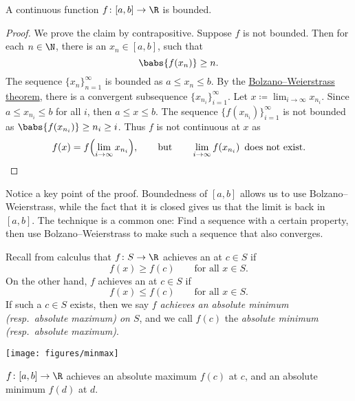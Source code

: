 \begin{lemma}
A continuous function $f \colon [a,b] \to \R$ is bounded.
\end{lemma}

\begin{proof}
We prove the claim by contrapositive.  Suppose $f$ is not bounded.
Then for each
$n \in \N$, there is an $x_n \in [a,b]$, such that
\begin{equation*}
\babs{f(x_n)} \geq n .
\end{equation*}
The sequence $\{ x_n \}_{n=1}^\infty$ is bounded as $a \leq x_n \leq b$.
By the \hyperref[thm:bwseq]{Bolzano--Weierstrass theorem},
there is a convergent subsequence $\{ x_{n_i} \}_{i=1}^\infty$.
Let $x \coloneqq \lim_{i\to\infty} x_{n_i}$.
Since $a \leq x_{n_i} \leq b$ for all $i$, then $a \leq x \leq b$.
The sequence $\bigl\{ f(x_{n_i}) \bigr\}_{i=1}^\infty$ is not bounded 
as 
$\babs{f(x_{n_i})} \geq n_i \geq i$.
Thus $f$ is not continuous at $x$ as
\begin{equation*}
f(x)
=
f\Bigl( \lim_{i\to\infty} x_{n_i} \Bigr) ,
\qquad \text{but} \qquad
\lim_{i\to\infty} f(x_{n_i}) \enspace \text{does not exist.} \qedhere
\end{equation*}
\end{proof}

Notice a key point of the proof.
Boundedness of $[a,b]$ allows us to use Bolzano--Weierstrass,
while the fact that it is closed gives us that the limit is back in $[a,b]$.
The technique is a common one: Find a sequence with a certain property,
then use Bolzano--Weierstrass to make such a sequence that also converges.

Recall from calculus that $f \colon S \to \R$ achieves an
\emph{}%
at $c \in S$ if
\begin{equation*}
f(x) \geq f(c) \qquad \text{for all } x \in S.
\end{equation*}
On the other hand, $f$ achieves an 
\emph{}%
at $c \in S$ if
\begin{equation*}
f(x) \leq f(c) \qquad \text{for all } x \in S.
\end{equation*}
If such a $c \in S$ exists, then we say
$f$ \emph{achieves an absolute minimum (resp.\ absolute maximum) on
$S$}, and we call
$f(c)$ the \emph{absolute minimum (resp.\ absolute maximum)}.
\begin{myfigureht}
\texttt{[image: figures/minmax]}
\caption{$f \colon [a,b] \to \R$ achieves an absolute maximum $f(c)$ at
$c$, and an absolute minimum $f(d)$ at $d$.\label{fig:minmax}}
\end{myfigureht}

